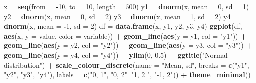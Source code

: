 \documentclass[]{article}
\newenvironment{Shaded}{\begin{snugshade}}{\end{snugshade}}
\newcommand{\KeywordTok}[1]{\textcolor[rgb]{0.13,0.29,0.53}{\textbf{#1}}}
\newcommand{\DataTypeTok}[1]{\textcolor[rgb]{0.13,0.29,0.53}{#1}}
\newcommand{\DecValTok}[1]{\textcolor[rgb]{0.00,0.00,0.81}{#1}}
\newcommand{\FloatTok}[1]{\textcolor[rgb]{0.00,0.00,0.81}{#1}}
\newcommand{\StringTok}[1]{\textcolor[rgb]{0.31,0.60,0.02}{#1}}
\newcommand{\OperatorTok}[1]{\textcolor[rgb]{0.81,0.36,0.00}{\textbf{#1}}}
\newcommand{\NormalTok}[1]{#1}
\begin{document}
\begin{Shaded}
\begin{Highlighting}[]
\NormalTok{x =}\StringTok{ }\KeywordTok{seq}\NormalTok{(}\DataTypeTok{from =} \OperatorTok{-}\DecValTok{10}\NormalTok{, }\DataTypeTok{to =} \DecValTok{10}\NormalTok{, }\DataTypeTok{length =} \DecValTok{500}\NormalTok{)}
\NormalTok{y1 =}\StringTok{ }\KeywordTok{dnorm}\NormalTok{(x, }\DataTypeTok{mean =} \DecValTok{0}\NormalTok{, }\DataTypeTok{sd =} \DecValTok{1}\NormalTok{)}
\NormalTok{y2 =}\StringTok{ }\KeywordTok{dnorm}\NormalTok{(x, }\DataTypeTok{mean =} \DecValTok{0}\NormalTok{, }\DataTypeTok{sd =} \DecValTok{2}\NormalTok{)}
\NormalTok{y3 =}\StringTok{ }\KeywordTok{dnorm}\NormalTok{(x, }\DataTypeTok{mean =} \DecValTok{1}\NormalTok{, }\DataTypeTok{sd =} \DecValTok{2}\NormalTok{)}
\NormalTok{y4 =}\StringTok{ }\KeywordTok{dnorm}\NormalTok{(x, }\DataTypeTok{mean =} \OperatorTok{-}\DecValTok{1}\NormalTok{, }\DataTypeTok{sd =} \DecValTok{2}\NormalTok{)}
\NormalTok{df =}\StringTok{ }\KeywordTok{data.frame}\NormalTok{(x, y1, y2, y3, y4)}
\KeywordTok{ggplot}\NormalTok{(df, }\KeywordTok{aes}\NormalTok{(x, }\DataTypeTok{y =}\NormalTok{ value, }\DataTypeTok{color =}\NormalTok{ variable)) }\OperatorTok{+}\StringTok{ }\KeywordTok{geom_line}\NormalTok{(}\KeywordTok{aes}\NormalTok{(}\DataTypeTok{y =}\NormalTok{ y1, }
    \DataTypeTok{col =} \StringTok{"y1"}\NormalTok{)) }\OperatorTok{+}\StringTok{ }\KeywordTok{geom_line}\NormalTok{(}\KeywordTok{aes}\NormalTok{(}\DataTypeTok{y =}\NormalTok{ y2, }\DataTypeTok{col =} \StringTok{"y2"}\NormalTok{)) }\OperatorTok{+}\StringTok{ }\KeywordTok{geom_line}\NormalTok{(}\KeywordTok{aes}\NormalTok{(}\DataTypeTok{y =}\NormalTok{ y3, }
    \DataTypeTok{col =} \StringTok{"y3"}\NormalTok{)) }\OperatorTok{+}\StringTok{ }\KeywordTok{geom_line}\NormalTok{(}\KeywordTok{aes}\NormalTok{(}\DataTypeTok{y =}\NormalTok{ y4, }\DataTypeTok{col =} \StringTok{"y4"}\NormalTok{)) }\OperatorTok{+}\StringTok{ }\KeywordTok{ylim}\NormalTok{(}\DecValTok{0}\NormalTok{, }\FloatTok{0.5}\NormalTok{) }\OperatorTok{+}\StringTok{ }
\StringTok{    }\KeywordTok{ggtitle}\NormalTok{(}\StringTok{"Normal distribution"}\NormalTok{) }\OperatorTok{+}\StringTok{ }\KeywordTok{scale_colour_discrete}\NormalTok{(}\DataTypeTok{name =} \StringTok{"Mean, sd"}\NormalTok{, }
    \DataTypeTok{breaks =} \KeywordTok{c}\NormalTok{(}\StringTok{"y1"}\NormalTok{, }\StringTok{"y2"}\NormalTok{, }\StringTok{"y3"}\NormalTok{, }\StringTok{"y4"}\NormalTok{), }\DataTypeTok{labels =} \KeywordTok{c}\NormalTok{(}\StringTok{"0, 1"}\NormalTok{, }\StringTok{"0, 2"}\NormalTok{, }\StringTok{"1, 2 "}\NormalTok{, }
        \StringTok{"-1, 2"}\NormalTok{)) }\OperatorTok{+}\StringTok{ }\KeywordTok{theme_minimal}\NormalTok{()}
\end{Highlighting}
\end{Shaded}
\end{document}
